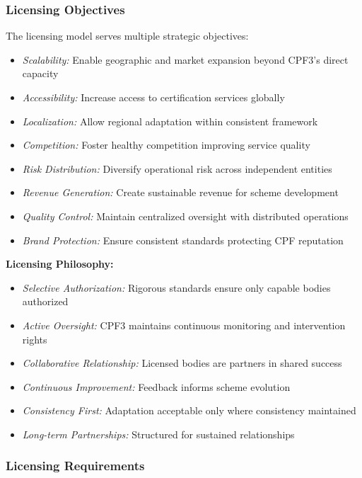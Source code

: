 \documentclass[11pt,a4paper]{article}
\begin{document}
\subsubsection{Licensing Objectives}

The licensing model serves multiple strategic objectives:

\begin{itemize}
\item \textit{Scalability:} Enable geographic and market expansion beyond CPF3's direct capacity
\item \textit{Accessibility:} Increase access to certification services globally
\item \textit{Localization:} Allow regional adaptation within consistent framework
\item \textit{Competition:} Foster healthy competition improving service quality
\item \textit{Risk Distribution:} Diversify operational risk across independent entities
\item \textit{Revenue Generation:} Create sustainable revenue for scheme development
\item \textit{Quality Control:} Maintain centralized oversight with distributed operations
\item \textit{Brand Protection:} Ensure consistent standards protecting CPF reputation
\end{itemize}

\textbf{Licensing Philosophy:}

\begin{itemize}
\item \textit{Selective Authorization:} Rigorous standards ensure only capable bodies authorized
\item \textit{Active Oversight:} CPF3 maintains continuous monitoring and intervention rights
\item \textit{Collaborative Relationship:} Licensed bodies are partners in shared success
\item \textit{Continuous Improvement:} Feedback informs scheme evolution
\item \textit{Consistency First:} Adaptation acceptable only where consistency maintained
\item \textit{Long-term Partnerships:} Structured for sustained relationships
\end{itemize}

\subsubsection{Licensing Requirements}
\end{document}
